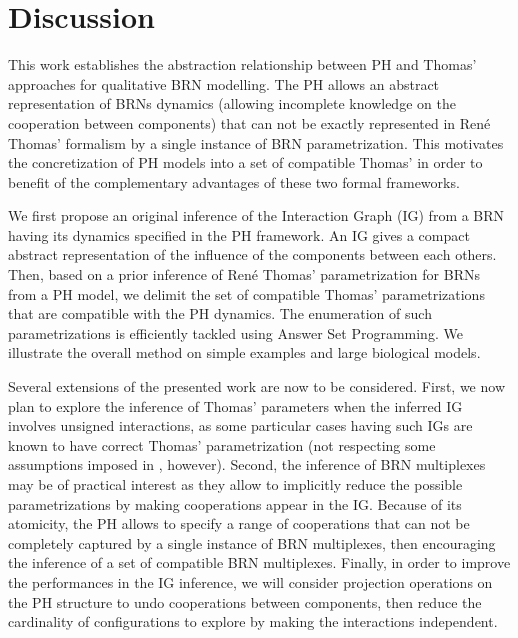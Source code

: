 \section{Discussion}

This work establishes the abstraction relationship between PH and Thomas' approaches for
qualitative BRN modelling.
The PH allows an abstract representation of BRNs dynamics (allowing incomplete knowledge on the
cooperation between components) that can not be exactly represented in Ren\'e Thomas' formalism by a
single instance of BRN parametrization.
This motivates the concretization of PH models into a set of compatible Thomas' in order to benefit
of the complementary advantages of these two formal frameworks.

We first propose an original inference of the Interaction Graph (IG) from a BRN
having its dynamics specified in the PH framework.
An IG gives a compact abstract representation of the influence of the components between each
others.
Then, based on a prior inference of Ren\'e Thomas' parametrization for BRNs from a PH model, we
delimit the set of compatible Thomas' parametrizations that are compatible with the PH dynamics.
The enumeration of such parametrizations is efficiently tackled using Answer Set Programming.
We illustrate the overall method on simple examples and large biological models.

Several extensions of the presented work are now to be considered.
First, we now plan to explore the inference of Thomas' parameters when the inferred IG involves unsigned interactions, as some particular cases having such IGs are known to have correct
Thomas' parametrization (not respecting some assumptions imposed in ,
however).
Second, the inference of BRN multiplexes \cite{BernotMultiplexes} may be of practical interest 
as they allow to implicitly reduce the possible parametrizations by making cooperations appear
in the IG.
Because of its atomicity, the PH allows to specify a range of cooperations that can not be
completely captured by a single instance of BRN multiplexes, then encouraging the inference of a set
of compatible BRN multiplexes.
Finally, in order to improve the performances in the IG inference, we will consider projection operations on
the PH structure to undo cooperations between components, then reduce the cardinality of
configurations to explore by making the interactions independent.

